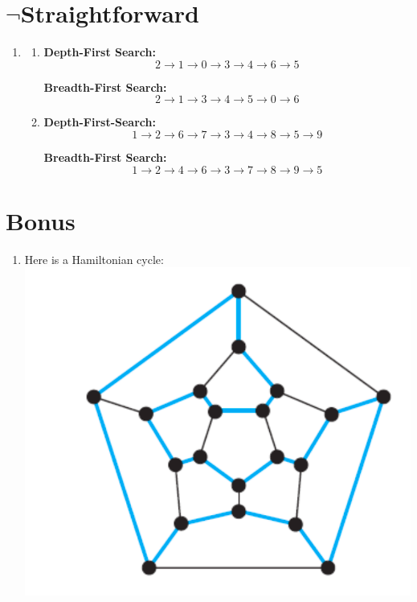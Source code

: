 \documentclass[a4paper]{article}
\begin{document}
\section{$\neg$Straightforward}
    \begin{enumerate}
        
        \item \begin{enumerate}

            \item \textbf{Depth-First Search:} \\
            \[ 2 \rightarrow 1 \rightarrow 0 \rightarrow 3 \rightarrow 4 \rightarrow 6 \rightarrow 5 \]

            \textbf{Breadth-First Search:} \\
            \[ 2 \rightarrow 1 \rightarrow 3 \rightarrow 4 \rightarrow 5 \rightarrow 0 \rightarrow 6 \]

            \item \textbf{Depth-First-Search:} \\
            \[ 1 \rightarrow 2 \rightarrow 6 \rightarrow 7 \rightarrow 3 \rightarrow 4 \rightarrow 8 \rightarrow 5 \rightarrow 9 \]

            \textbf{Breadth-First Search:} \\
            \[ 1 \rightarrow 2 \rightarrow 4 \rightarrow 6 \rightarrow 3 \rightarrow 7 \rightarrow 8 \rightarrow 9 \rightarrow 5 \]

        \end{enumerate}

    \end{enumerate}

\newpage
\section{Bonus}
    \begin{enumerate}
        \item Here is a Hamiltonian cycle:\\
        \includegraphics[width=0.7\linewidth]{"DM A5 Diagram 1.png"}
    \end{enumerate}
\end{document}
